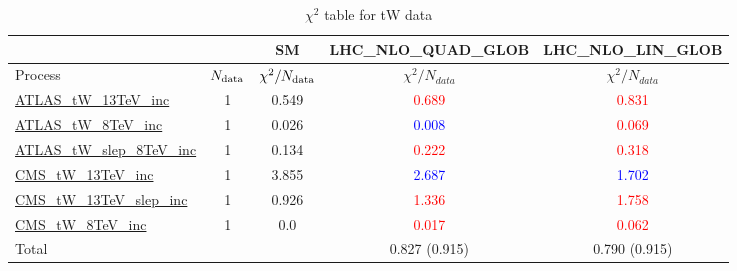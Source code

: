 \documentclass{article}
\begin{document}
\begin{table}[H]
\centering
\begin{tabular}{|l|c|c|c|c|}
\hline
 \multicolumn{2}{|c|}{} & SM& LHC_NLO_QUAD_GLOB& LHC_NLO_LIN_GLOB\\ \hline
Process & $N_{\rm data}$ & $\chi^ 2/N_{\rm data}$& $\chi^ 2/N_{data}$& $\chi^ 2/N_{data}$\\ \hline
\href{https://arxiv.org}{ATLAS_tW_13TeV_inc} & 1 & 0.549 & \textcolor{red}                            {0.689} & \textcolor{red}                            {0.831} \\ \hline
\href{https://arxiv.org}{ATLAS_tW_8TeV_inc} & 1 & 0.026 & \textcolor{blue}                            {0.008} & \textcolor{red}                            {0.069} \\ \hline
\href{https://arxiv.org}{ATLAS_tW_slep_8TeV_inc} & 1 & 0.134 & \textcolor{red}                            {0.222} & \textcolor{red}                            {0.318} \\ \hline
\href{https://arxiv.org}{CMS_tW_13TeV_inc} & 1 & 3.855 & \textcolor{blue}                            {2.687} & \textcolor{blue}                            {1.702} \\ \hline
\href{https://arxiv.org}{CMS_tW_13TeV_slep_inc} & 1 & 0.926 & \textcolor{red}                            {1.336} & \textcolor{red}                            {1.758} \\ \hline
\href{https://arxiv.org}{CMS_tW_8TeV_inc} & 1 & 0.0 & \textcolor{red}                            {0.017} & \textcolor{red}                            {0.062} \\ \hline
\hline Total & &  & 0.827 (0.915) & 0.790 (0.915) \\ \hline
\end{tabular}
\caption{$\chi^2$ table for tW data}
\end{table}
\end{document}

